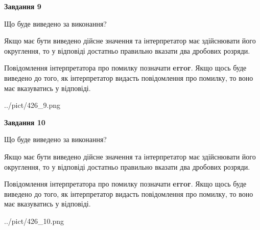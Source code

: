\documentclass[12pt, ukrainian]{article}
\begin{document}
{\begin {Large}
{\begin {center}\textbf{Завдання 9}\end {center}}\par
Що буде виведено за виконання? \par

Якщо має бути виведено дійсне значення та інтерпретатор має здійснювати його округлення, 
то у відповіді достатньо правильно вказати два дробових розряди.

Повідомлення інтерпретатора про помилку позначати \textbf{error}.
Якщо щось буде виведено до того, як інтерпретатор видасть повідомлення про помилку, 
то воно має вказуватись у відповіді. \par

\begin{center}
	{../pict/426_9.png}
\end{center}
\newpage

{\begin {center}\textbf{Завдання 10}\end {center}}\par
Що буде виведено за виконання? \par

Якщо має бути виведено дійсне значення та інтерпретатор має здійснювати його округлення, 
то у відповіді достатньо правильно вказати два дробових розряди.

Повідомлення інтерпретатора про помилку позначати \textbf{error}.
Якщо щось буде виведено до того, як інтерпретатор видасть повідомлення про помилку, 
то воно має вказуватись у відповіді. \par

\begin{center}
	{../pict/426_10.png}
\end{center}
\newpage

\end {Large}}
\end{document}
